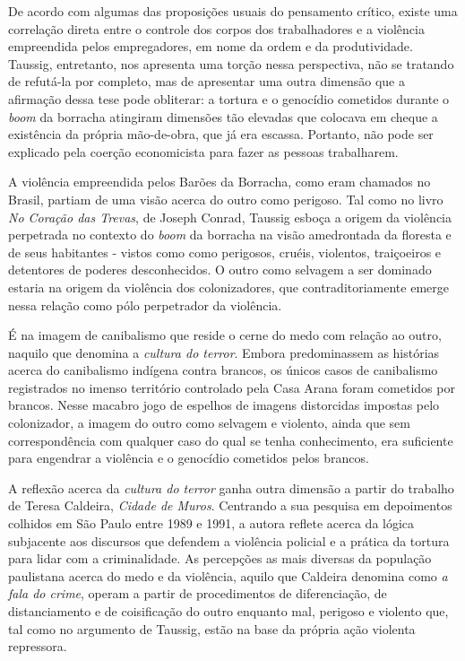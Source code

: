 De acordo com algumas das proposições usuais do pensamento crítico,
existe uma correlação direta entre o controle dos corpos dos
trabalhadores e a violência empreendida pelos empregadores, em nome da
ordem e da produtividade. Taussig, entretanto, nos apresenta uma torção
nessa perspectiva, não se tratando de refutá-la por completo, mas de
apresentar uma outra dimensão que a afirmação dessa tese pode obliterar:
a tortura e o genocídio cometidos durante o \emph{boom} da borracha
atingiram dimensões tão elevadas que colocava em cheque a existência da
própria mão-de-obra, que já era escassa. Portanto, não pode ser
explicado pela coerção economicista para fazer as pessoas trabalharem.

A violência empreendida pelos Barões da Borracha, como eram chamados no
Brasil, partiam de uma visão acerca do outro como perigoso. Tal como no
livro \emph{No Coração das Trevas}, de Joseph Conrad, Taussig esboça a
origem da violência perpetrada no contexto do \emph{boom} da borracha na
visão amedrontada da floresta e de seus habitantes - vistos como como
perigosos, cruéis, violentos, traiçoeiros e detentores de poderes
desconhecidos. O outro como selvagem a ser dominado estaria na origem da
violência dos colonizadores, que contraditoriamente emerge nessa relação
como pólo perpetrador da violência.

É na imagem de canibalismo que reside o cerne do medo com relação ao
outro, naquilo que denomina a \emph{cultura do terror}. Embora
predominassem as histórias acerca do canibalismo indígena contra
brancos, os únicos casos de canibalismo registrados no imenso território
controlado pela Casa Arana foram cometidos por brancos. Nesse macabro
jogo de espelhos de imagens distorcidas impostas pelo colonizador, a
imagem do outro como selvagem e violento, ainda que sem correspondência
com qualquer caso do qual se tenha conhecimento, era suficiente para
engendrar a violência e o genocídio cometidos pelos brancos.

A reflexão acerca da \emph{cultura do terror} ganha outra dimensão a
partir do trabalho de Teresa Caldeira, \emph{Cidade de Muros}. Centrando
a sua pesquisa em depoimentos colhidos em São Paulo entre 1989 e 1991, a
autora reflete acerca da lógica subjacente aos discursos que defendem a
violência policial e a prática da tortura para lidar com a
criminalidade. As percepções as mais diversas da população paulistana
acerca do medo e da violência, aquilo que Caldeira denomina como \emph{a
fala do crime}, operam a partir de procedimentos de diferenciação, de
distanciamento e de coisificação do outro enquanto mal, perigoso e
violento que, tal como no argumento de Taussig, estão na base da própria
ação violenta repressora.

